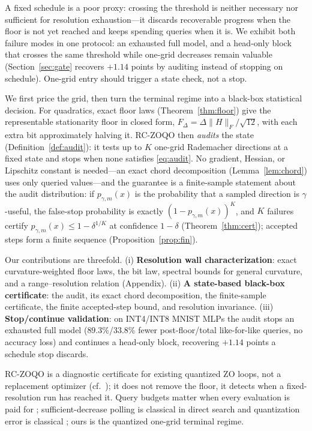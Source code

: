 \documentclass{article}
\newcommand{\D}{\Delta}
\begin{document}
A fixed schedule is a poor proxy: crossing the threshold is neither necessary nor sufficient for resolution exhaustion---it discards recoverable progress when the floor is not yet reached and keeps spending queries when it is. We exhibit both failure modes in one protocol: an exhausted full model, and a head-only block that crosses the same threshold while one-grid decreases remain valuable (Section~\ref{sec:gate} recovers $+1.14$ points by auditing instead of stopping on schedule). One-grid entry should trigger a state check, not a stop.

We first price the grid, then turn the terminal regime into a black-box statistical decision. For quadratics, exact floor laws (Theorem~\ref{thm:floor}) give the representable stationarity floor in closed form, $F_{\D}=\D\|H\|_F/\sqrt{12}$, with each extra bit approximately halving it. RC-ZOQO then \emph{audits} the state (Definition~\ref{def:audit}): it tests up to $K$ one-grid Rademacher directions at a fixed state and stops when none satisfies \eqref{eq:audit}. No gradient, Hessian, or Lipschitz constant is needed---an exact chord decomposition (Lemma~\ref{lem:chord}) uses only queried values---and the guarantee is a finite-sample statement about the audit distribution: if $p_{\gamma,m}(x)$ is the probability that a sampled direction is $\gamma$-useful, the false-stop probability is exactly $(1-p_{\gamma,m}(x))^K$, and $K$ failures certify $p_{\gamma,m}(x)\le1-\delta^{1/K}$ at confidence $1-\delta$ (Theorem~\ref{thm:cert}); accepted steps form a finite sequence (Proposition~\ref{prop:fin}).

Our contributions are threefold. (i) \textbf{Resolution wall characterization}: exact curvature-weighted floor laws, the bit law, spectral bounds for general curvature, and a range--resolution relation (Appendix). (ii) \textbf{A state-based black-box certificate}: the audit, its exact chord decomposition, the finite-sample certificate, the finite accepted-step bound, and resolution invariance. (iii) \textbf{Stop/continue validation}: on INT4/INT8 MNIST MLPs the audit stops an exhausted full model ($89.3$\%/$33.8$\% fewer post-floor/total like-for-like queries, no accuracy loss) and continues a head-only block, recovering $+1.14$ points a schedule stop discards.

RC-ZOQO is a diagnostic certificate for existing quantized ZO loops, not a replacement optimizer (cf.\ \cite{bergou2020stp}); it does not remove the floor, it detects when a fixed-resolution run has reached it. Query budgets matter when every evaluation is paid for \cite{chen2017zoo,ilyas2018limited}; sufficient-decrease polling is classical in direct search \cite{gratton2015pds} and quantization error is classical \cite{hou2019quantized}; ours is the quantized one-grid terminal regime.
\end{document}

